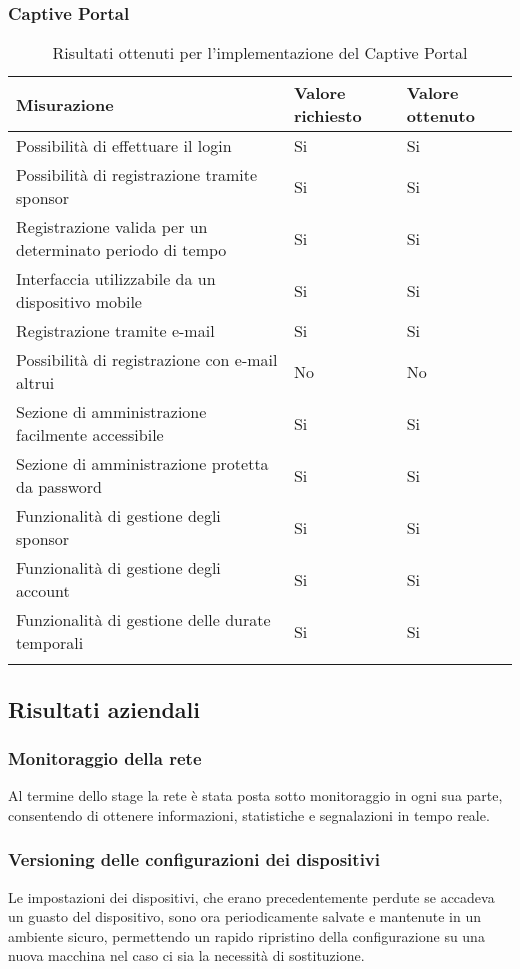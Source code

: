 \documentclass[Tesi.tex]{subfiles}
\begin{document}
\newpage
\subsubsection{Captive Portal}
\label{table:Risultati ottenuti per l'implementazione del Captive Portal}
\renewcommand*{\arraystretch}{1.2}
\begin{longtable}[H]{p{9.5cm}p{3.2cm}p{2cm}}
	\rowcolor{CHeader}
	\color{CHeaderText} \textbf{Misurazione} & \color{CHeaderText} \textbf{Valore richiesto}& \color{CHeaderText} \textbf{Valore ottenuto}  \\
	\endhead
	Possibilità di effettuare il login &
	Si & Si \\
	Possibilità di registrazione tramite sponsor &
	Si & Si \\
	Registrazione valida per un determinato periodo di tempo &
	Si & Si \\
	Interfaccia utilizzabile da un dispositivo mobile &
	Si & Si \\
	Registrazione tramite e-mail &
	Si & Si \\
	Possibilità di registrazione con e-mail altrui &
	No & No \\
	Sezione di amministrazione facilmente accessibile &
	Si & Si \\
	Sezione di amministrazione protetta da password &
	Si & Si \\
	Funzionalità di gestione degli sponsor &
	Si & Si \\
	Funzionalità di gestione degli account &
	Si & Si \\
	Funzionalità di gestione delle durate temporali &
	Si & Si \\
	
	\hiderowcolors
	\caption{Risultati ottenuti per l'implementazione del Captive Portal}
\end{longtable}

\newpage
\subsection{Risultati aziendali}
\subsubsection{Monitoraggio della rete}
Al termine dello stage la rete è stata posta sotto monitoraggio in ogni sua parte, consentendo di ottenere informazioni, statistiche e segnalazioni in tempo reale.

\subsubsection{Versioning delle configurazioni dei dispositivi}
Le impostazioni dei dispositivi, che erano precedentemente perdute se accadeva un guasto del dispositivo, sono ora periodicamente salvate e mantenute in un ambiente sicuro, permettendo un rapido ripristino della configurazione su una nuova macchina nel caso ci sia la necessità di sostituzione.
\end{document}
